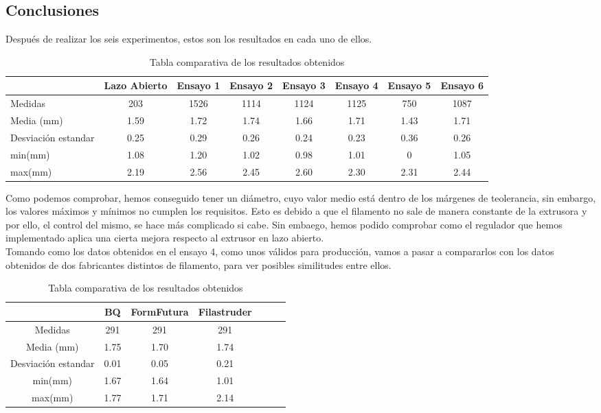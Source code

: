 \subsection{Conclusiones}

Después de realizar los seis experimentos, estos son los resultados en cada uno de ellos.\\

\begin{table}[H]
	\centering
	\begin{tabular}{lccccccc}
		                    &Lazo Abierto     & Ensayo 1 & Ensayo 2 & Ensayo 3 & Ensayo 4 & Ensayo 5 & Ensayo 6 \\ \hline
		Medidas             &     203         & 1526     & 1114     & 1124     & 1125     & 750      & 1087     \\
		Media (mm)          &	1.59		 & 1.72     & 1.74     & 1.66     & 1.71     & 1.43     & 1.71     \\
		Desviación estandar &	0.25		 & 0.29     & 0.26     & 0.24     & 0.23     & 0.36     & 0.26     \\
		min(mm)             &	1.08		 & 1.20     & 1.02     & 0.98     & 1.01     & 0        & 1.05     \\
		max(mm)             &	2.19		 & 2.56     & 2.45     & 2.60     & 2.30     & 2.31     & 2.44    
	\end{tabular}
	\caption{Tabla comparativa de los resultados obtenidos}
	\label{tab:compara_results}
\end{table}


Como podemos comprobar, hemos conseguido tener un diámetro, cuyo valor medio está dentro de los márgenes de teolerancia, sin embargo, los valores máximos y mínimos no cumplen los requisitos. Esto es debido a que el filamento no sale de manera constante de la extrusora y por ello, el control del mismo, se hace más complicado si cabe. Sin embaego, hemos podido comprobar como el regulador que hemos implementado aplica una cierta mejora respecto al extrusor en lazo abierto.\\

Tomando como los datos obtenidos en el ensayo 4, como unos válidos para producción, vamos a pasar a compararlos con los datos obtenidos de dos fabricantes distintos de filamento, para ver posibles similitudes entre ellos.

\begin{table}[H]
	\centering
	\begin{tabular}{ccccccc}
		                    & BQ & FormFutura & Filastruder \\ \hline
		Medidas             & 291     &291    & 291      \\
		Media (mm)          & 1.75     & 1.70     & 1.74      \\
		Desviación estandar & 0.01     & 0.05     & 0.21      \\
		min(mm)             & 1.67     & 1.64     & 1.01      \\
		max(mm)             & 1.77     & 1.71     & 2.14     
	\end{tabular}
	\caption{Tabla comparativa de los resultados obtenidos}
	\label{tab:compara_results}
\end{table}


